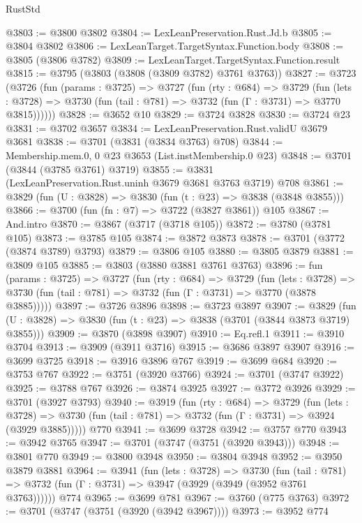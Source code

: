 \begin{lexlean}{RustStd}
\begin{coremodule}
{\begin{coremodule}
{{{{{{{{{{{{{{@3803 := @3800 @3802
@3804 := LexLeanPreservation.Rust.Jd.b
@3805 := @3804 @3802
@3806 := LexLeanTarget.TargetSyntax.Function.body
@3808 := @3805 (@3806 @3782)
@3809 := LexLeanTarget.TargetSyntax.Function.result
@3815 := @3795 (@3803 (@3808 (@3809 @3782) @3761 @3763))
@3827 := @3723
    (@3726
      (fun (params : @3725) =>
      @3727
        (fun (rty : @684) =>
        @3729
          (fun (lets : @3728) =>
          @3730 (fun (tail : @781) => @3732 (fun (Γ : @3731) => @3770 @3815))))))
@3828 := @3652 @10
@3829 := @3724 @3828
@3830 := @3724 @23
@3831 := @3702 @3657
@3834 := LexLeanPreservation.Rust.validU @3679 @3681
@3838 := @3701 (@3831 (@3834 @3763) @708)
@3844 := Membership.mem.{0, 0} @23 @3653 (List.instMembership.{0} @23)
@3848 := @3701 (@3844 (@3785 @3761) @3719)
@3855 := @3831 (LexLeanPreservation.Rust.uninh @3679 @3681 @3763 @3719) @708
@3861 := @3829 (fun (U : @3828) => @3830 (fun (t : @23) => @3838 (@3848 @3855)))
@3866 := @3700 (fun (fn : @7) => @3722 (@3827 @3861)) @105
@3867 := And.intro
@3870 := @3867 (@3717 (@3718 @105))
@3872 := @3780 (@3781 @105)
@3873 := @3785 @105
@3874 := @3872 @3873
@3878 := @3701 (@3772 (@3874 @3789) @3793)
@3879 := @3806 @105
@3880 := @3805 @3879
@3881 := @3809 @105
@3885 := @3803 (@3880 @3881 @3761 @3763)
@3896 := fun (params : @3725) =>
  @3727
    (fun (rty : @684) =>
    @3729
      (fun (lets : @3728) =>
      @3730 (fun (tail : @781) => @3732 (fun (Γ : @3731) => @3770 (@3878 @3885)))))
@3897 := @3726 @3896
@3898 := @3723 @3897
@3907 := @3829 (fun (U : @3828) => @3830 (fun (t : @23) => @3838 (@3701 (@3844 @3873 @3719) @3855)))
@3909 := @3870 (@3898 @3907)
@3910 := Eq.refl.{1}
@3911 := @3910 @3704
@3913 := @3909 (@3911 @3716)
@3915 := @3686 @3897 @3907
@3916 := @3699 @3725
@3918 := @3916 @3896 @767
@3919 := @3699 @684
@3920 := @3753 @767
@3922 := @3751 (@3920 @3766)
@3924 := @3701 (@3747 @3922)
@3925 := @3788 @767
@3926 := @3874 @3925
@3927 := @3772 @3926
@3929 := @3701 (@3927 @3793)
@3940 := @3919
    (fun (rty : @684) =>
    @3729
      (fun (lets : @3728) =>
      @3730 (fun (tail : @781) => @3732 (fun (Γ : @3731) => @3924 (@3929 @3885)))))
    @770
@3941 := @3699 @3728
@3942 := @3757 @770
@3943 := @3942 @3765
@3947 := @3701 (@3747 (@3751 (@3920 @3943)))
@3948 := @3801 @770
@3949 := @3800 @3948
@3950 := @3804 @3948
@3952 := @3950 @3879 @3881
@3964 := @3941
    (fun (lets : @3728) =>
    @3730
      (fun (tail : @781) => @3732 (fun (Γ : @3731) => @3947 (@3929 (@3949 (@3952 @3761 @3763))))))
    @774
@3965 := @3699 @781
@3967 := @3760 (@775 @3763)
@3972 := @3701 (@3747 (@3751 (@3920 (@3942 @3967))))
@3973 := @3952 @774
}}}}}}}}}}}}}}
\end{coremodule}}
\end{coremodule}
\end{lexlean}
